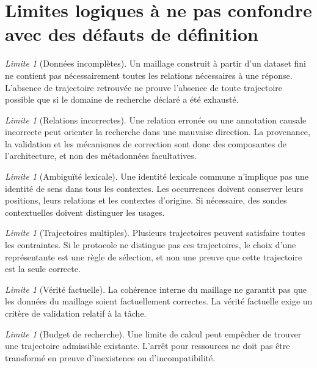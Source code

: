 \documentclass[11pt,a4paper,oneside]{book}
\theoremstyle{remark}
\newtheorem{limite}[definition]{Limite}
\begin{document}
\section{Limites logiques à ne pas confondre avec des défauts de définition}

\begin{limite}[Données incomplètes]
Un maillage construit à partir d'un dataset fini ne contient pas
nécessairement toutes les relations nécessaires à une réponse.
L'absence de trajectoire retrouvée ne prouve l'absence de toute
trajectoire possible que si le domaine de recherche déclaré a été
exhausté.
\end{limite}

\begin{limite}[Relations incorrectes]
Une relation erronée ou une annotation causale incorrecte peut
orienter la recherche dans une mauvaise direction. La provenance,
la validation et les mécanismes de correction sont donc des
composantes de l'architecture, et non des métadonnées facultatives.
\end{limite}

\begin{limite}[Ambiguïté lexicale]
Une identité lexicale commune n'implique pas une identité de sens
dans tous les contextes. Les occurrences doivent conserver leurs
positions, leurs relations et les contextes d'origine. Si nécessaire,
des sondes contextuelles doivent distinguer les usages.
\end{limite}

\begin{limite}[Trajectoires multiples]
Plusieurs trajectoires peuvent satisfaire toutes les contraintes.
Si le protocole ne distingue pas ces trajectoires, le choix d'une
représentante est une règle de sélection, et non une preuve que
cette trajectoire est la seule correcte.
\end{limite}

\begin{limite}[Vérité factuelle]
La cohérence interne du maillage ne garantit pas que les données
du maillage soient factuellement correctes. La vérité factuelle
exige un critère de validation relatif à la tâche.
\end{limite}

\begin{limite}[Budget de recherche]
Une limite de calcul peut empêcher de trouver une trajectoire
admissible existante. L'arrêt pour ressources ne doit pas être
transformé en preuve d'inexistence ou d'incompatibilité.
\end{limite}
\end{document}
